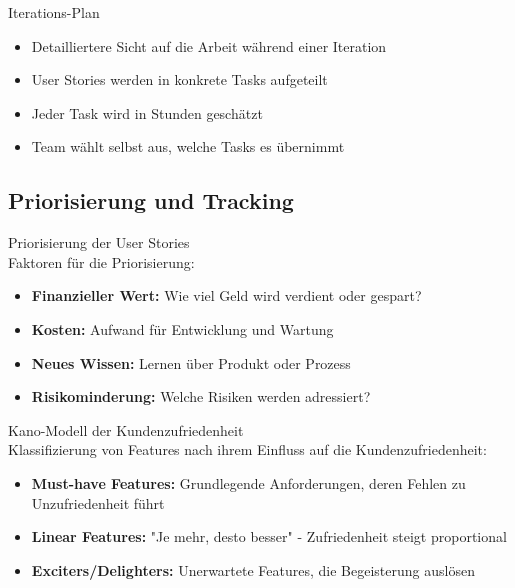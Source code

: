 \begin{concept}{Iterations-Plan}\\
    \begin{itemize}
        \item Detailliertere Sicht auf die Arbeit während einer Iteration
        \item User Stories werden in konkrete Tasks aufgeteilt
        \item Jeder Task wird in Stunden geschätzt
        \item Team wählt selbst aus, welche Tasks es übernimmt
    \end{itemize}
\end{concept}

\subsection{Priorisierung und Tracking}

\begin{concept}{Priorisierung der User Stories}\\
    Faktoren für die Priorisierung:
    \begin{itemize}
        \item \textbf{Finanzieller Wert:} Wie viel Geld wird verdient oder gespart?
        \item \textbf{Kosten:} Aufwand für Entwicklung und Wartung
        \item \textbf{Neues Wissen:} Lernen über Produkt oder Prozess
        \item \textbf{Risikominderung:} Welche Risiken werden adressiert?
    \end{itemize}
\end{concept}

\begin{concept}{Kano-Modell der Kundenzufriedenheit}\\
    Klassifizierung von Features nach ihrem Einfluss auf die Kundenzufriedenheit:
    \begin{itemize}
        \item \textbf{Must-have Features:} Grundlegende Anforderungen, deren Fehlen zu Unzufriedenheit führt
        \item \textbf{Linear Features:} "Je mehr, desto besser" - Zufriedenheit steigt proportional
        \item \textbf{Exciters/Delighters:} Unerwartete Features, die Begeisterung auslösen
    \end{itemize}
\end{concept}


